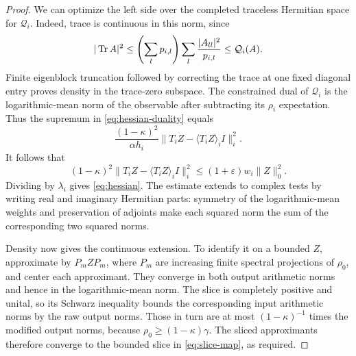 \begin{proof}
We can optimize the left side over the completed traceless Hermitian
space for $\mathcal Q_i$. Indeed, trace is continuous in this norm,
since
\[
 |\operatorname{Tr} A|^2\le\left(\sum_l p_{i,l}\right)
                   \sum_l\frac{|A_{ll}|^2}{p_{i,l}}
 \le\mathcal Q_i(A).
\]
Finite eigenblock truncation followed by correcting the trace at one
fixed diagonal entry proves density in the trace-zero subspace.
The constrained dual of $\mathcal Q_i$ is the logarithmic-mean norm
of the observable after subtracting its $\rho_i$ expectation. Thus
the supremum in \eqref{eq:hessian-duality} equals
\[
 \frac{(1-\kappa)^2}{\alpha h_i}
   \|T_iZ-\langle T_iZ\rangle_iI\|_i^2.
\]
It follows that
\[
 (1-\kappa)^2
  \|T_iZ-\langle T_iZ\rangle_iI\|_i^2
 \le(1+\varepsilon)w_i\|Z\|_0^2.
\]
Dividing by $\lambda_i$ gives \eqref{eq:hessian}. The estimate
extends to complex tests by writing real and imaginary Hermitian
parts: symmetry of the logarithmic-mean weights and preservation
of adjoints make each squared norm the sum of the corresponding
two squared norms.

Density now gives the continuous extension. To identify it on a
bounded $Z$, approximate by $P_mZP_m$, where $P_m$ are increasing
finite spectral projections of $\rho_0$, and center each approximant.
They converge in both output arithmetic norms and hence in the
logarithmic-mean norm. The slice is completely positive and unital,
so its Schwarz inequality bounds the corresponding input arithmetic
norms by the raw output norms. Those in turn are at most
$(1-\kappa)^{-1}$ times the modified output norms, because
$\rho_0\ge(1-\kappa)\gamma$. The sliced approximants therefore
converge to the bounded slice in \eqref{eq:slice-map}, as required.
\end{proof}
